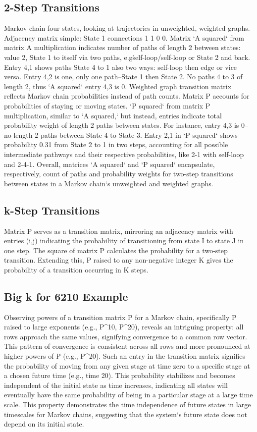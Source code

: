 \subsection*{2-Step Transitions}
Markov chain four states, looking at trajectories in unweighted, weighted graphs.
Adjacency matrix simple: State 1 connections 1 1 0 0.
Matrix `A squared` from matrix A multiplication indicates number of paths of length 2 between states: value 2, State 1 to itself via two paths, e.g\. self-loop/self-loop or State 2 and back.
Entry 4,1 shows paths State 4 to 1 also two ways: self-loop then edge or vice versa.
Entry 4,2 is one, only one path--State 1 then State 2.
No paths 4 to 3 of length 2, thus `A squared` entry 4,3 is 0.
Weighted graph transition matrix reflects Markov chain probabilities instead of path counts.
Matrix P accounts for probabilities of staying or moving states.
`P squared` from matrix P multiplication, similar to `A squared,` but instead, entries indicate total probability weight of length 2 paths between states.
For instance, entry 4,3 is 0--no length 2 paths between State 4 to State 3.
Entry 2,1 in `P squared` shows probability 0.31 from State 2 to 1 in two steps, accounting for all possible intermediate pathways and their respective probabilities, like 2-1 with self-loop and 2-4-1.
Overall, matrices `A squared` and `P squared` encapsulate, respectively, count of paths and probability weights for two-step transitions between states in a Markov chain`s unweighted and weighted graphs.

\subsection*{k-Step Transitions}
Matrix P serves as a transition matrix, mirroring an adjacency matrix with entries (i,j) indicating the probability of transitioning from state I to state J in one step.
The square of matrix P calculates the probability for a two-step transition.
Extending this, P raised to any non-negative integer K gives the probability of a transition occurring in K steps.

\subsection*{Big k for 6210 Example}
Observing powers of a transition matrix P for a Markov chain, specifically P raised to large exponents (e.g., P\textasciicircum{}10, P\textasciicircum{}20), reveals an intriguing property: all rows approach the same values, signifying convergence to a common row vector.
This pattern of convergence is consistent across all rows and more pronounced at higher powers of P (e.g., P\textasciicircum{}20).
Such an entry in the transition matrix signifies the probability of moving from any given stage at time zero to a specific stage at a chosen future time (e.g., time 20).
This probability stabilizes and becomes independent of the initial state as time increases, indicating all states will eventually have the same probability of being in a particular stage at a large time scale.
This property demonstrates the time independence of future states in large timescales for Markov chains, suggesting that the system`s future state does not depend on its initial state.

